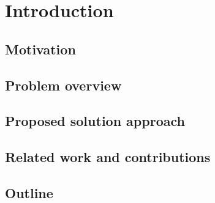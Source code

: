 \chapter{Introduction}
\label{sec:intro}

\section{Motivation}

\section{Problem overview}

\section{Proposed solution approach}

\section{Related work and contributions}

\section{Outline}